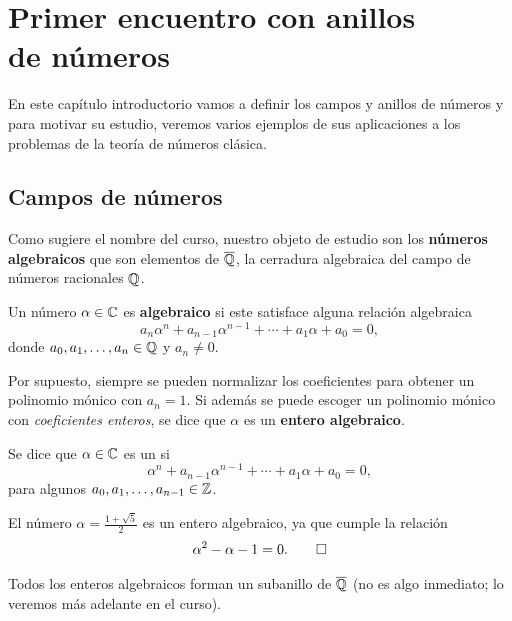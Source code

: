 \chapter{Primer encuentro con anillos\texorpdfstring{\\}{ }de números}

En este capítulo introductorio vamos a definir los campos y anillos de números y
para motivar su estudio, veremos varios ejemplos de sus aplicaciones a los
problemas de la teoría de números clásica.


\section{Campos de números}

Como sugiere el nombre del curso, nuestro objeto de estudio son los
\textbf{números algebraicos} que son elementos de $\overline{\mathbb{Q}}$, la cerradura
algebraica del campo de números racionales $\mathbb{Q}$.

\begin{definicion}
  Un número $\alpha \in \mathbb{C}$ es \textbf{algebraico} si este satisface alguna
  relación algebraica
  $$a_n \alpha^n + a_{n-1} \alpha^{n-1} + \cdots + a_1 \alpha + a_0 = 0,$$
  donde $a_0,a_1,\ldots,a_n \in \mathbb{Q}$ y $a_n \ne 0$.
\end{definicion}

Por supuesto, siempre se pueden normalizar los coeficientes para obtener un
polinomio mónico con $a_n = 1$. Si además se puede escoger un polinomio mónico
con \emph{coeficientes enteros}, se dice que $\alpha$ es un
\textbf{entero algebraico}.

\begin{definicion}
  Se dice que $\alpha \in \mathbb{C}$ es un  si
  $$\alpha^n + a_{n-1} \alpha^{n-1} + \cdots + a_1 \alpha + a_0 = 0,$$
  para algunos $a_0,a_1,\ldots,a_{n-1} \in \mathbb{Z}$.
\end{definicion}

\begin{ejemplo}
  El número $\alpha = \frac{1 + \sqrt{5}}{2}$ es un entero algebraico, ya que
  cumple la relación
  \[ \alpha^2 - \alpha - 1 = 0. \qedhere \]
\end{ejemplo}

Todos los enteros algebraicos forman un subanillo de $\overline{\mathbb{Q}}$
(no es algo inmediato; lo veremos más adelante en el curso).

